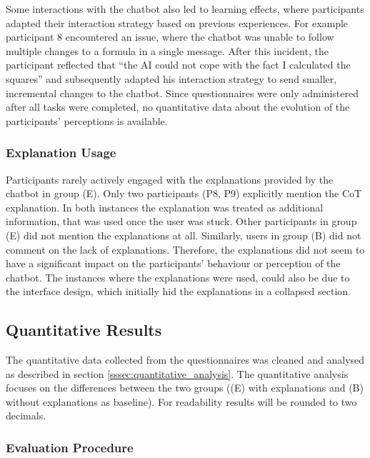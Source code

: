 Some interactions with the chatbot also led to learning effects, where participants adapted their interaction strategy based on previous experiences. For example participant 8 encountered an issue, where the chatbot was unable to follow multiple changes to a formula in a single message. After this incident, the participant reflected that “the AI could not cope with the fact I calculated the squares” and subsequently adapted his interaction strategy to send smaller, incremental changes to the chatbot. Since questionnaires were only administered after all tasks were completed, no quantitative data about the evolution of the participants' perceptions is available.

\subsubsection{Explanation Usage} \label{sssec:explanation_usage}

Participants rarely actively engaged with the explanations provided by the chatbot in group (E). Only two participants (P8, P9) explicitly mention the \ac{CoT} explanation. In both instances the explanation was treated as additional information, that was used once the user was stuck. Other participants in group (E) did not mention the explanations at all. Similarly, users in group (B) did not comment on the lack of explanations. Therefore, the explanations did not seem to have a significant impact on the participants' behaviour or perception of the chatbot. The instances where the explanations were used, could also be due to the interface design, which initially hid the explanations in a collapsed section.

\subsection{Quantitative Results} \label{ssec:quant_results}

The quantitative data collected from the questionnaires was cleaned and analysed as described in section \ref{sssec:quantitative_analysis}. The quantitative analysis focuses on the differences between the two groups ((E) with explanations and (B) without explanations as baseline).
For readability results will be rounded to two decimals.

\subsubsection{Evaluation Procedure} \label{sssec:eval_procedure}

